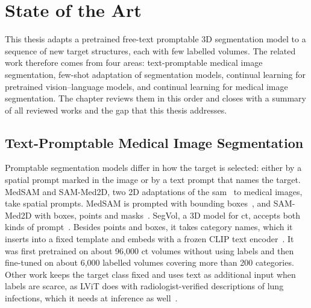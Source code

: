 %
%

\chapter{State of the Art}
\label{chap:sota}

This thesis adapts a pretrained free-text promptable 3D segmentation model to a sequence of new target structures, each with few labelled volumes.
The related work therefore comes from four areas: text-promptable medical image segmentation, few-shot adaptation of segmentation models, continual learning for pretrained vision--language models, and continual learning for medical image segmentation.
The chapter reviews them in this order and closes with a summary of all reviewed works and the gap that this thesis addresses.

\section{Text-Promptable Medical Image Segmentation}
\label{sec:text-promptable-seg}

Promptable segmentation models differ in how the target is selected: either by a spatial prompt marked in the image or by a text prompt that names the target.
MedSAM and SAM-Med2D, two 2D adaptations of the \gls{sam}~\cite{Kirillov_2023_ICCV} to medical images, take spatial prompts.
MedSAM is prompted with bounding boxes~\cite{Ma_2024}, and SAM-Med2D with boxes, points and masks~\cite{cheng2023sammed2d}.
SegVol, a 3D model for \gls{ct}, accepts both kinds of prompt~\cite{du2025segvoluniversalinteractivevolumetric}.
Besides points and boxes, it takes category names, which it inserts into a fixed template and embeds with a frozen CLIP text encoder~\cite{radford2021learningtransferablevisualmodels}.
It was first pretrained on about 96{,}000 \gls{ct} volumes without using labels and then fine-tuned on about 6{,}000 labelled volumes covering more than 200 categories.
Other work keeps the target class fixed and uses text as additional input when labels are scarce, as LViT does with radiologist-verified descriptions of lung infections, which it needs at inference as well~\cite{li2023lvitlanguagemeetsvision}.

